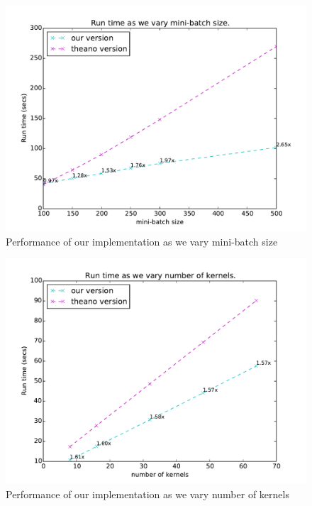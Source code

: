 \documentclass{article}
\begin{document}
 \begin{figure}[!htbp]
\begin{center}
\includegraphics[scale=0.6]{mini-batch.pdf}
\end{center}
\caption{Performance of our implementation as we vary mini-batch size}
\label{fig:minibatch}
\end{figure}

 \begin{figure}[!htbp]
\begin{center}
\includegraphics[scale=0.6]{n-kerns.pdf}
\end{center}
\caption{Performance of our implementation as we vary number of kernels}
\label{fig:n_kerns}
\end{figure}
\end{document}
